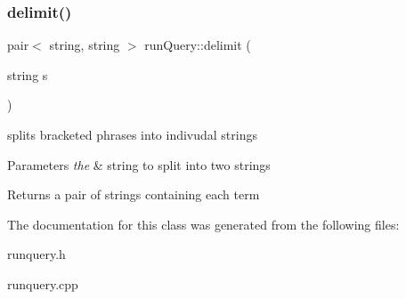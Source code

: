 \subsubsection{\texorpdfstring{delimit()}{delimit()}}
{\footnotesize\ttfamily pair$<$ string, string $>$ run\+Query\+::delimit (\begin{DoxyParamCaption}\item[{string}]{s }\end{DoxyParamCaption})}



splits bracketed phrases into indivudal strings 


\begin{DoxyParams}{Parameters}
{\em the} & string to split into two strings \\
\hline
\end{DoxyParams}
\begin{DoxyReturn}{Returns}
a pair of strings containing each term 
\end{DoxyReturn}


The documentation for this class was generated from the following files\+:\begin{DoxyCompactItemize}
\item 
runquery.\+h\item 
runquery.\+cpp\end{DoxyCompactItemize}
